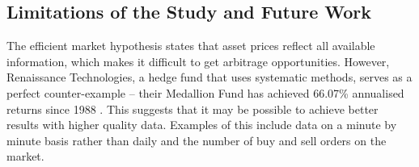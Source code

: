 \documentclass[a4paper, 11pt]{article}
\begin{document}
\subsection{Limitations of the Study and Future Work}
The efficient market hypothesis states that asset prices reflect all available information, which makes it difficult to get arbitrage opportunities. However, Renaissance Technologies, a hedge fund that uses systematic methods, serves as a perfect counter-example -- their Medallion Fund has achieved 66.07\% annualised returns since 1988 \cite{cornell2020medallion}. This suggests that it may be possible to achieve better results with higher quality data. Examples of this include data on a minute by minute basis rather than daily and the number of buy and sell orders on the market.



\end{document}
